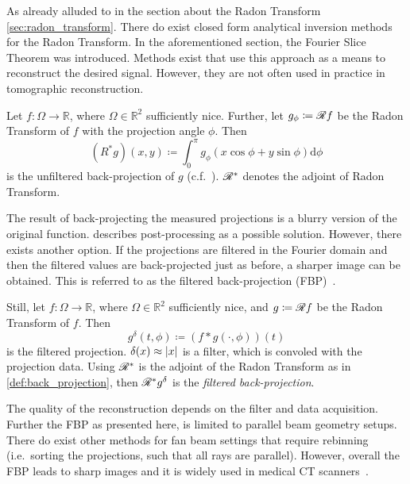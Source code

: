 As already alluded to in the section about the Radon Transform \ref{sec:radon_transform}. There do
exist closed form analytical inversion methods for the Radon Transform. In the aforementioned
section, the Fourier Slice Theorem was introduced. Methods exist that use this approach as a means
to reconstruct the desired signal. However, they are not often used in practice in tomographic
reconstruction.

\begin{definition}\label{def:back_projection}
	Let \(f\colon \Omega \to \mathbb{R}\), where \(\Omega \in \mathbb{R}^2\) sufficiently nice.
	Further, let \(g_\phi \coloneq \mathscr{R} f\) be the Radon Transform of \(f\) with the
	projection angle \(\phi\). Then
	\[ (R^\ast g)(x, y) \coloneq \int_0^\pi g_\phi(x\cos \phi + y \sin\phi) \mathrm{d}\phi \]
	is the unfiltered back-projection of \(g\) (c.f.~\cite{buzug_computed_2008}).
	\(\mathscr{R}^\ast\) denotes the adjoint of Radon Transform.
\end{definition}


The result of back-projecting the measured projections is a blurry version of the original function.
\citeauthor{buzug_computed_2008} describes post-processing as a possible solution. However, there
exists another option. If the projections are filtered in the Fourier domain and then the filtered
values are back-projected just as before, a sharper image can be obtained. This is referred to as
the filtered back-projection (FBP)~\cite{ramachandran_three-dimensional_1971}.

\begin{definition}\label{def:filtered_back_projection}
	Still, let \(f\colon \Omega \to \mathbb{R}\), where \(\Omega \in \mathbb{R}^2\) sufficiently
	nice, and \(g \coloneq \mathscr{R} f\) be the Radon Transform of \(f\). Then
	\[ g^\delta(t, \phi) \coloneq (f \ast g(\cdot, \phi))(t) \]
	is the filtered projection. \(\delta(x) \approx \lvert x\rvert\) is a filter, which is convoled
	with the projection data. Using \(\mathscr{R}^\ast\) is the adjoint of the Radon Transform
	as in \autoref{def:back_projection}, then \(\mathscr{R}^\ast g^\delta\) is the
	\textit{filtered back-projection}.
\end{definition}

The quality of the reconstruction depends on the filter and data acquisition. Further the FBP as
presented here, is limited to parallel beam geometry setups. There do exist other methods for fan
beam settings that require rebinning (i.e.\ sorting the projections, such that all rays are
parallel). However, overall the FBP leads to sharp images and it is widely used in medical CT
scanners~\cite{pan_why_2009}.

